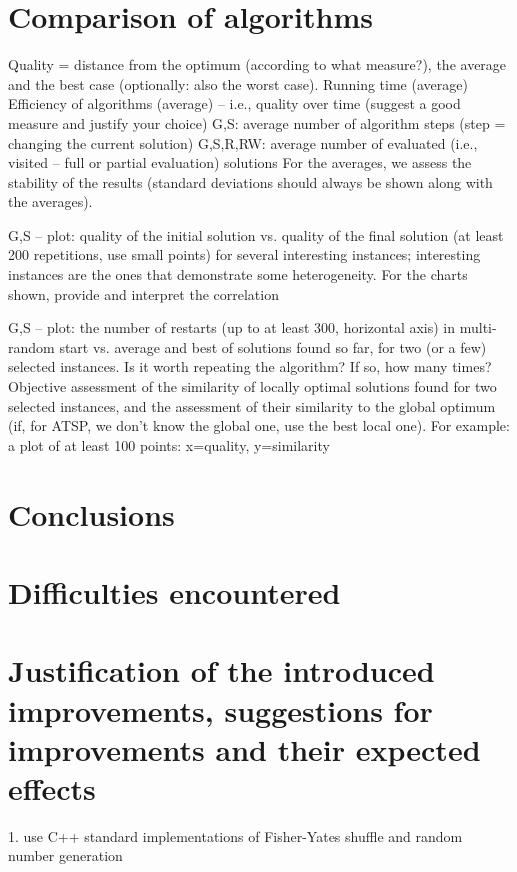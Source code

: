 \documentclass{article}
\begin{document}
\section{Comparison of algorithms}
Quality = distance from the optimum (according to what measure?), the average and the best case (optionally: also the worst case).
Running time (average)
Efficiency of algorithms (average) – i.e., quality over time (suggest a good measure and justify your choice)
G,S: average number of algorithm steps (step = changing the current solution)
G,S,R,RW: average number of evaluated (i.e., visited – full or partial evaluation) solutions
For the averages, we assess the stability of the results (standard deviations should always be shown along with the averages).


G,S – plot: quality of the initial solution vs. quality of the final solution (at least 200 repetitions, use small points) for several interesting instances; interesting instances are the ones that demonstrate some heterogeneity. For the charts shown, provide and interpret the correlation

G,S – plot: the number of restarts (up to at least 300, horizontal axis) in multi-random start vs. average and best of solutions found so far, for two (or a few) selected instances. Is it worth repeating the algorithm? If so, how many times?
Objective assessment of the similarity of locally optimal solutions found for two selected instances, and the assessment of their similarity to the global optimum (if, for ATSP, we don't know the global one, use the best local one). For example: a plot of at least 100 points: x=quality, y=similarity

\section{Conclusions}

\section{Difficulties encountered}

\section{Justification of the introduced improvements, suggestions for improvements and their expected effects}

1. use C++ standard implementations of Fisher-Yates shuffle and random number generation


\end{document}
